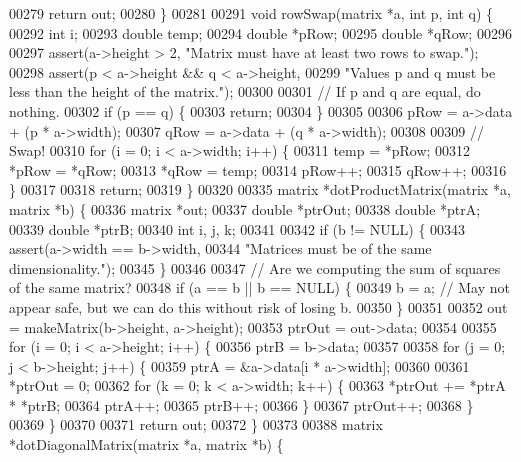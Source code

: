 \begin{DoxyCode}
{{{00279   \textcolor{keywordflow}{return} out;
00280 \}
00281 
00291 \textcolor{keywordtype}{void} rowSwap(matrix *a, \textcolor{keywordtype}{int} p, \textcolor{keywordtype}{int} q) \{
00292   \textcolor{keywordtype}{int} i;
00293   \textcolor{keywordtype}{double} temp;
00294   \textcolor{keywordtype}{double} *pRow;
00295   \textcolor{keywordtype}{double} *qRow;
00296 
00297   assert(a->height > 2, \textcolor{stringliteral}{"Matrix must have at least two rows to swap."});
00298   assert(p < a->height && q < a->height,
00299          \textcolor{stringliteral}{"Values p and q must be less than the height of the matrix."});
00300 
00301   \textcolor{comment}{// If p and q are equal, do nothing.}
00302   \textcolor{keywordflow}{if} (p == q) \{
00303     \textcolor{keywordflow}{return};
00304   \}
00305 
00306   pRow = a->data + (p * a->width);
00307   qRow = a->data + (q * a->width);
00308 
00309   \textcolor{comment}{// Swap!}
00310   \textcolor{keywordflow}{for} (i = 0; i < a->width; i++) \{
00311     temp = *pRow;
00312     *pRow = *qRow;
00313     *qRow = temp;
00314     pRow++;
00315     qRow++;
00316   \}
00317 
00318   \textcolor{keywordflow}{return};
00319 \}
00320 
00335 matrix *dotProductMatrix(matrix *a, matrix *b) \{
00336   matrix *out;
00337   \textcolor{keywordtype}{double} *ptrOut;
00338   \textcolor{keywordtype}{double} *ptrA;
00339   \textcolor{keywordtype}{double} *ptrB;
00340   \textcolor{keywordtype}{int} i, j, k;
00341 
00342   \textcolor{keywordflow}{if} (b != NULL) \{
00343     assert(a->width == b->width,
00344            \textcolor{stringliteral}{"Matrices must be of the same dimensionality."});
00345   \}
00346 
00347   \textcolor{comment}{// Are we computing the sum of squares of the same matrix?}
00348   \textcolor{keywordflow}{if} (a == b || b == NULL) \{
00349     b = a; \textcolor{comment}{// May not appear safe, but we can do this without risk of losing b.}
00350   \}
00351 
00352   out = makeMatrix(b->height, a->height);
00353   ptrOut = out->data;
00354 
00355   \textcolor{keywordflow}{for} (i = 0; i < a->height; i++) \{
00356     ptrB = b->data;
00357 
00358     \textcolor{keywordflow}{for} (j = 0; j < b->height; j++) \{
00359       ptrA = &a->data[i * a->width];
00360 
00361       *ptrOut = 0;
00362       \textcolor{keywordflow}{for} (k = 0; k < a->width; k++) \{
00363         *ptrOut += *ptrA * *ptrB;
00364         ptrA++;
00365         ptrB++;
00366       \}
00367       ptrOut++;
00368     \}
00369   \}
00370 
00371   \textcolor{keywordflow}{return} out;
00372 \}
00373 
00388 matrix *dotDiagonalMatrix(matrix *a, matrix *b) \{
}}}
\end{DoxyCode}
